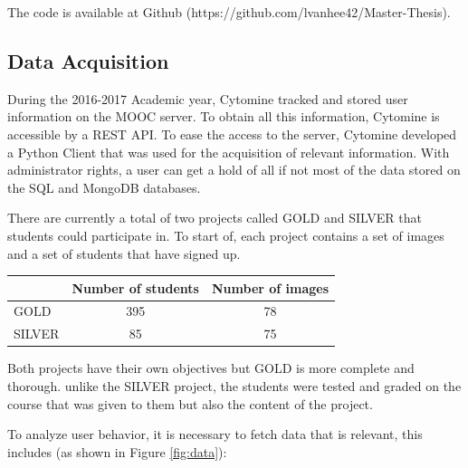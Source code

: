 \documentclass[a4paper,11pt]{report}
\numberwithin{figure}{section} %
\begin{document}
        The code is available at Github (https://github.com/lvanhee42/Master-Thesis).

		\subsection{Data Acquisition}

			During the 2016-2017 Academic year, Cytomine tracked and stored user information on the MOOC server.
			To obtain all this information, Cytomine is accessible by a REST API. To ease the access to the server, Cytomine developed a Python Client that was used for the acquisition of relevant information.
			With administrator rights, a user can get a hold of all if not most of the data stored on the SQL and MongoDB databases.

          There are currently a total of two projects called GOLD and SILVER that students could participate in.
          To start of, each project contains a set of images and a set of students that have signed up.

          \begin{center}
          \begin{tabular}{| l | c | c |}
          \hline
           & Number of students & Number of images \\ \hline
           GOLD & 395 & 78 \\ \hline
           SILVER & 85 & 75 \\
          \hline
          \end{tabular}
          \end{center}

		  Both projects have their own objectives but GOLD is more complete and thorough.
		  unlike the SILVER project, the students were tested and graded on the course that was given to them but also the content of the project.

          To analyze user behavior, it is necessary to fetch data that is relevant, this includes (as shown in Figure \ref{fig:data}):
\end{document}
